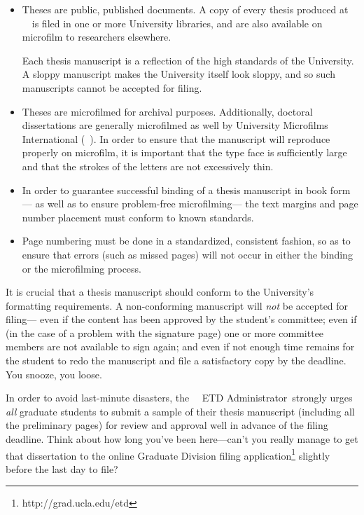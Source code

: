 \documentclass {article}
\newcommand {\caps}[1] {\mbox {\ifnum\fam=0 \scshape\else\uppercase\fi{#1}}}
\newcommand {\tdadvisor} {ETD Administrator}
\newcommand {\ucla} {\caps {ucla}}
\newcommand {\umi} {\caps {umi}}
\begin{document}
\begin {itemize}

\item
Theses are public, published documents.
A copy of every thesis produced at \ucla\
is filed in one or more University libraries,
and are also available on microfilm
to researchers elsewhere.

Each thesis manuscript is a reflection
of the high standards of the University.
A sloppy manuscript makes the University itself look sloppy,
and so such manuscripts cannot be accepted for filing.

\item
Theses are microfilmed for archival purposes.
Additionally, doctoral dissertations are generally
microfilmed as well by University Microfilms International (\umi).
In order to ensure that the manuscript
will reproduce properly on microfilm,
it is important that the type face is sufficiently large
and that the strokes of the letters are not excessively thin.

\item
In order to guarantee successful binding
of a thesis manuscript in book form---%
as well as to ensure problem-free microfilming---%
the text margins and page number placement
must conform to known standards.

\item
Page numbering must be done in a standardized, consistent fashion,
so as to ensure that errors (such as missed pages)
will not occur in either the binding or the microfilming process.

\end {itemize}

It is crucial that a thesis manuscript
should conform to the University's formatting requirements.
A non-conforming manuscript will \emph{not} be accepted for filing---%
even if the content has been approved
by the student's committee;
even if (in the case of a problem with the signature page)
one or more committee members are not available to sign again;
and even if not enough time remains for the student
to redo the manuscript and file a satisfactory copy by the deadline.
You snooze, you loose.

In order to avoid last-minute disasters,
the \ucla\ \tdadvisor\ strongly urges \emph{all} graduate students
to submit a sample of their thesis manuscript
(including all the preliminary pages)
for review and approval well in advance of the filing deadline.
Think about how long you've been here---can't you really 
  manage to get that dissertation to the online Graduate Division
filing application\footnote{http://grad.ucla.edu/etd}  slightly 
before the last day to file?
\end{document}
